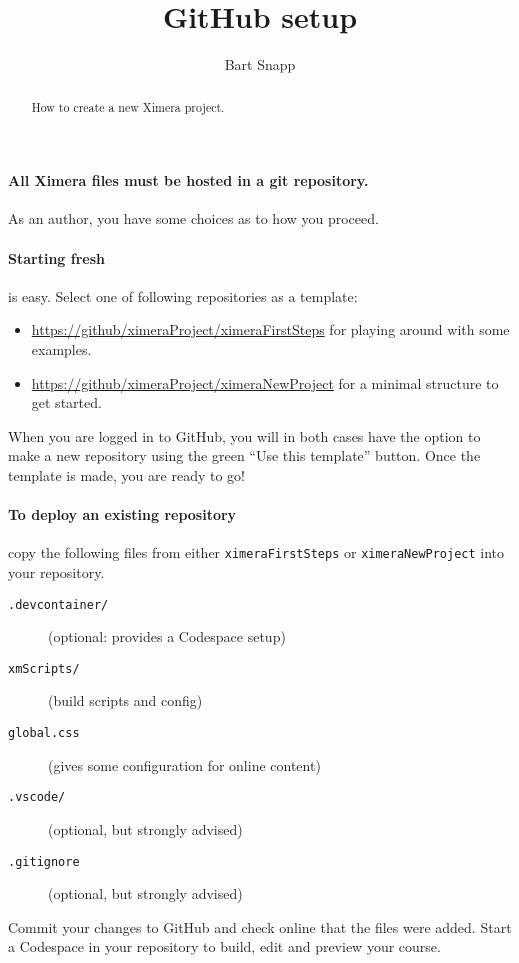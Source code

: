 \documentclass{ximera}
\title{GitHub setup}
\author{Bart Snapp}
\begin{document}
\begin{abstract}
    How to create a new Ximera project.
\end{abstract}
\maketitle

\paragraph{All Ximera files must be hosted in a git repository.}
As an author, you have some choices as to how you proceed.

\paragraph{Starting fresh} is easy.
Select one of following repositories as a template:
\begin{itemize}
    \item \url{https://github/ximeraProject/ximeraFirstSteps} for playing around with some examples.
    \item \url{https://github/ximeraProject/ximeraNewProject} for a minimal structure to get started.
\end{itemize}
When you are logged in to GitHub, you
will in both cases have the option to make a new repository using the green ``Use this
template'' button. Once the template is made, you are ready to go!

\paragraph{To deploy an existing repository} copy the
following files from either \verb!ximeraFirstSteps! or \verb!ximeraNewProject!
into your repository.
        \begin{description}
            \item[\texttt{.devcontainer/}] (optional: provides a Codespace setup) 
            \item[\texttt{xmScripts/}]  (build scripts and config)
            \item[\texttt{global.css}] (gives some configuration for online content)
            \item[\texttt{.vscode/}]  (optional, but strongly advised)
            \item[\texttt{.gitignore}]	(optional, but strongly advised)
        \end{description}
Commit your changes to GitHub and check online that the files were added.
Start a Codespace in your repository to build, edit and preview your course.
\end{document}
